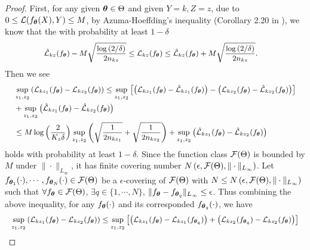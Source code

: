 \begin{proof}
	First, for any given $\text{\boldmath{$\theta$}}\in \Theta$ and given $Y = k, Z = z$, due to $0\leq \mathcal{L}(f_{\text{\boldmath{$\theta$}}}(X), Y) \leq M$, by Azuma-Hoeffding’s inequality (Corollary 2.20 in \citep{wainwright2019}), we know that the with probability at least $1 - \delta$ 
	\begin{equation}
		\small
		\begin{aligned}
			& \hat{\cL}_{kz}(f_{\btheta}) - M\sqrt{\frac{\log{(2/\delta)}}{2n_{kz}}} \leq \cL_{kz}(f_{\btheta}) \leq  \hat{\cL}_{kz}(f_{\btheta}) + M\sqrt{\frac{\log{(2/\delta)}}{2n_{kz}}}.
		\end{aligned}
	\end{equation}
	Then we see 
	\begin{equation}
		\small
		\begin{aligned}
			& \sup_{z_{1}, z_{2}}\left(\cL_{kz_{1}}(f_{\btheta}) - \cL_{kz_{2}}(f_{\btheta})\right)
			\leq \sup_{z_{1}, z_{2}}\left[\left(\cL_{kz_{1}}(f_{\btheta}) - \hat{\cL}_{kz_{1}}(f_{\btheta})\right) - \left(\cL_{kz_{2}}(f_{\btheta}) - \hat{\cL}_{kz_{2}}(f_{\btheta})\right)  \right] \\
			& + \sup_{z_{1},z_{2}}\left(\hat{\cL}_{kz_{1}}(f_{\btheta}) - \hat{\cL}_{kz_{2}}(f_{\btheta})\right) \\
			& \leq M\log{\left(\frac{2}{K_{z}\delta}\right)}\sup_{z_{1}, z_{2}}\left(\sqrt{\frac{1}{2n_{kz_{1}}}} + \sqrt{\frac{1}{2n_{kz_{2}}}}\right) + \sup_{z_{1},z_{2}}\left(\hat{\cL}_{kz_{1}}(f_{\btheta}) - \hat{\cL}_{kz_{2}}(f_{\btheta})\right)
		\end{aligned}
	\end{equation}
	holds with probability at least $1 - \delta$. Since the function class $\mathcal{F}(\Theta)$ is bounded by $M$ under $\|\cdot\|_{L_{\infty}}$, it has finite covering number $N\left(\epsilon, \mathcal{F}(\Theta), \|\cdot\|_{L_{\infty}}\right)$. Let $f_{\text{\boldmath{$\theta$}}_{1}}(\cdot),\cdots, f_{\text{\boldmath{$\theta$}}_{N}}(\cdot)\in \mathcal{F}(\Theta)$ be a $\epsilon$-covering of $\mathcal{F}(\Theta)$ with $N \leq N\left(\epsilon, \mathcal{F}(\Theta), \|\cdot\|_{L_{\infty}}\right)$ such that $\forall f_{\text{\boldmath{$\theta$}}}\in \mathcal{F}(\Theta)$, $\exists q\in\{1,\cdots, N\}$, $\|f_{\text{\boldmath{$\theta$}}} - f_{\text{\boldmath{$\theta$}}_{q}}\|_{L_{\infty}}\leq \epsilon$. Thus combining the above inequality, for any $f_{\text{\boldmath{$\theta$}}}(\cdot)$ and its corresponded $f_{\text{\boldmath{$\theta$}}_{q}}(\cdot)$, we have
	\begin{equation}\label{eq:conditional expectation estimation}
		\small
		\begin{aligned}
			\sup_{z_{1}, z_{2}} & \left(\cL_{kz_{1}}(f_{\btheta}) - \cL_{kz_{2}}(f_{\btheta})\right) \leq \sup_{z_{1}, z_{2}}\left[\left(\cL_{kz_{1}}(f_{\btheta}) - \cL_{kz_{1}}(f_{\btheta_{q}})\right) + \left(\cL_{kz_{2}}(f_{\btheta_{q}}) -  \cL_{kz_{2}}(f_{\btheta})\right)\right] \\

\end{aligned}
\end{equation}
\end{proof}
